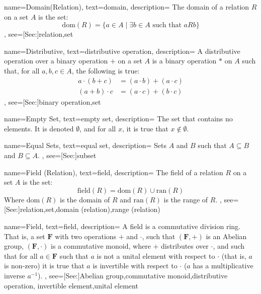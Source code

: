 {
    name={Domain\newline(Relation)},
    text={domain},
    description={
        The domain of a relation $R$ on a set $A$ is the set:
        \begin{equation*}
            \textrm{dom}(R)=\big\{a\in{A}\;|\;\exists{b}\in{A}
                \textrm{ such that }aRb\big\}
        \end{equation*}
    },
    see=[See:]{relation,set}
}

{
    name={Distributive},
    text={distributive operation},
    description={
        A distributive operation over a binary operation $+$ on a set
        $A$ is a binary operation $*$ on $A$ such that, for all
        $a,b,c\in{A}$, the following is true:
        {%
            \begin{align*}
                a\cdot(b+c)&=(a\cdot{b})+(a\cdot{c})\\
                (a+b)\cdot{c}&=(a\cdot{c})+(b\cdot{c})
            \end{align*}
        }%
    },
    see=[See:]{binary operation,set}
}

{
    name={Empty Set},
    text={empty set},
    description={
        The set that contains no elements. It is denoted $\emptyset$, and
        for all $x$, it is true that $x\notin\emptyset$.
    }
}

{
    name={Equal Sets},
    text={equal set},
    description={
        Sets $A$ and $B$ such that $A\subseteq{B}$ and $B\subseteq{A}$.
    },
    see=[See:]{subset}
}

{
    name={Field (Relation)},
    text={field},
    description={
        The field of a relation $R$ on a set $A$ is the set:
        \begin{equation*}
            \textrm{field}(R)=\textrm{dom}(R)\cup\textrm{ran}(R)
        \end{equation*}
        Where $\textrm{dom}(R)$ is the domain of $R$ and $\textrm{ran}(R)$
        is the range of $R$.
    },
    see=[See:]{relation,set,domain (relation),range (relation)}
}

{
    name={Field},
    text={field},
    description={
        A field is a commutative division ring. That is, a set $\mathbf{F}$ with
        two operations $+$ and $\cdot$, such that $(\mathbf{F},+)$ is an Abelian
        group, $(\mathbf{F},\cdot)$ is a commutative monoid, where $+$
        distributes over $\cdot$, and such that for all $a\in\mathbf{F}$ such
        that $a$ is not a unital element with respect to $\cdot$ (that is,
        $a$ is non-zero) it is true that $a$ is invertible with respect to
        $\cdot$ ($a$ has a multiplicative inverse $a^{\minus{1}}$).
    },
    see=[See:]{Abelian group,commutative monoid,distributive operation,%
               invertible element,unital element}
}

